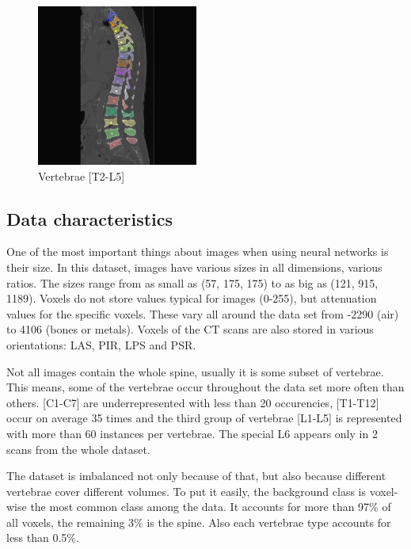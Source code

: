 \begin{figure}[ht]
    \centering
    \includegraphics[width=150pt]{images/vertebrae-annotations.png}
    \caption{Vertebrae [T2-L5]}
    \label{fig:vertebrae-annotations}
\end{figure}

\subsection{Data characteristics}
One of the most important things about images when using neural networks is their size. In this dataset, images have various sizes in all dimensions, various ratios. The sizes range from as small as (57, 175, 175) to as big as (121, 915, 1189). Voxels do not store values typical for images (0-255), but attenuation values for the specific voxels. These vary all around the data set from -2290 (air) to 4106 (bones or metals). Voxels of the CT scans are also stored in various orientations: LAS, PIR, LPS and PSR.

Not all images contain the whole spine, usually it is some subset of vertebrae. This means, some of the vertebrae occur throughout the data set more often than others. [C1-C7] are underrepresented with less than 20 occurencies, [T1-T12] occur on average 35 times and the third group of vertebrae [L1-L5] is represented with more than 60 instances per vertebrae. The special L6 appears only in 2 scans from the whole dataset.

The dataset is imbalanced not only because of that, but also because different vertebrae cover different volumes. To put it easily, the background class is voxel-wise the most common class among the data. It accounts for more than 97\% of all voxels, the remaining 3\% is the spine. Also each vertebrae type accounts for less than 0.5\%. 

